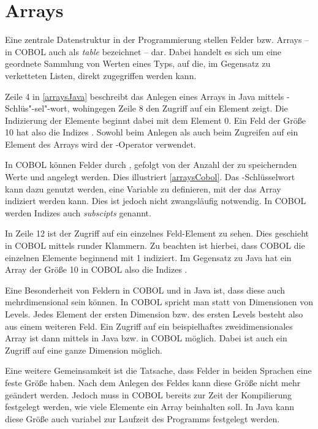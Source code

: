 \section{Arrays}\label{sec:felder}
Eine zentrale Datenstruktur in der Programmierung stellen Felder bzw. Arrays -- in COBOL auch als \textit{table} bezeichnet -- dar. Dabei handelt es sich um eine geordnete Sammlung von Werten eines Typs, auf die, im Gegensatz zu \zB verketteten Listen, direkt zugegriffen werden kann. 

Zeile 4 in \autoref{arraysJava} beschreibt das Anlegen eines Arrays in Java mittels -Schlüs"-sel"-wort, wohingegen Zeile 8 den Zugriff auf ein Element zeigt. Die Indizierung der Elemente beginnt dabei mit dem Element 0. Ein Feld der Größe 10 hat also die Indizes . Sowohl beim Anlegen als auch beim Zugreifen auf ein Element des Arrays wird der \jav{[]}-Operator verwendet.

In COBOL können Felder durch , gefolgt von der Anzahl der zu speichernden Werte und  angelegt werden. Dies illustriert \autoref{arraysCobol}. Das -Schlüsselwort kann dazu genutzt werden, eine Variable zu definieren, mit der das Array indiziert werden kann. Dies ist jedoch nicht zwangsläufig notwendig. In COBOL werden Indizes auch \textit{subscipts} genannt.

In Zeile 12 ist der Zugriff auf ein einzelnes Feld-Element zu sehen. Dies geschieht in COBOL mittels runder Klammern. Zu beachten ist hierbei, dass COBOL die einzelnen Elemente beginnend mit 1 indiziert. Im Gegensatz zu Java hat ein Array der Größe 10 in COBOL also die Indizes .

Eine Besonderheit von Feldern in COBOL und in Java ist, dass diese auch mehrdimensional sein können. In COBOL spricht man statt von Dimensionen von Levels. Jedes Element der ersten Dimension bzw. des ersten Levels besteht also aus einem weiteren Feld. Ein Zugriff auf ein beispielhaftes zweidimensionales Array ist dann mittels \jav{[][]} in Java bzw.  in COBOL möglich. Dabei ist auch ein Zugriff auf eine ganze Dimension möglich.

Eine weitere Gemeinsamkeit ist die Tatsache, dass Felder in beiden Sprachen eine feste Größe haben. Nach dem Anlegen des Feldes kann diese Größe nicht mehr geändert werden. Jedoch muss in COBOL bereits zur Zeit der Kompilierung festgelegt werden, wie viele Elemente ein Array beinhalten soll. In Java kann diese Größe auch variabel zur Laufzeit des Programms festgelegt werden.
